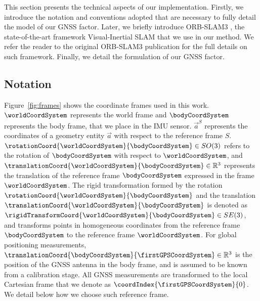 This section presents the technical aspects of our implementation. Firstly, we introduce the notation and conventions adopted that are necessary to fully detail the model of our GNSS factor. Later, we briefly introduce ORB-SLAM3 \cite{campos2021orbslam3}, the state-of-the-art framework Visual-Inertial SLAM that we use in our method. We refer the reader to the original ORB-SLAM3 publication for the full details on such framework. Finally, we detail the formulation of our GNSS factor.

\subsection{Notation}
Figure~\ref{fig:frames} shows the coordinate frames used in this work. $\worldCoordSystem$ represents the world frame and $\bodyCoordSystem$ represents the body frame, that we place in the IMU sensor. $\vec{a}^{S}$ represents the coordinates of a geometry entity $\vec{a}$ with respect to the reference frame $S$. $\rotationCoord{\worldCoordSystem}{\bodyCoordSystem} \in SO(3)$ refers to the rotation of $\bodyCoordSystem$ with respect to $\worldCoordSystem$, and $\translationCoord{\worldCoordSystem}{\bodyCoordSystem} \in \mathbb{R}^3$ represents the translation of the reference frame $\bodyCoordSystem$ expressed in the frame $\worldCoordSystem$. The rigid transformation formed by the rotation $\rotationCoord{\worldCoordSystem}{\bodyCoordSystem}$ and the translation $\translationCoord{\worldCoordSystem}{\bodyCoordSystem}$ is denoted as $\rigidTransformCoord{\worldCoordSystem}{\bodyCoordSystem} \in SE(3)$, and transforms points in homogeneous coordinates from the reference frame ${\bodyCoordSystem}$ to the reference frame ${\worldCoordSystem}$. For global positioning measurements, $\translationCoord{\bodyCoordSystem}{\firstGPSCoordSystem} \in \mathbb{R}^3$ is the position of the GNSS antenna in the body frame, and is assumed to be known from a calibration stage. All GNSS measurements are transformed to the local Cartesian frame that we denote as ${\coordIndex{\firstGPSCoordSystem}{0}}$. We detail below how we choose such reference frame.

